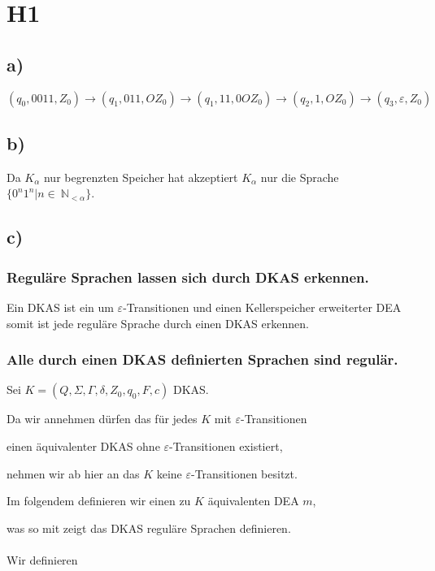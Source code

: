 \section*{H1}

\subsection*{a)}

$(q_{0},0011,Z_{0}) \to (q_{1},011,OZ_{0}) \to (q_{1},11,0OZ_{0}) \to (q_{2},1,OZ_{0}) \to (q_{3},\varepsilon,Z_{0})$

\subsection*{b)}

Da $K_{\alpha}$ nur begrenzten Speicher hat akzeptiert $K_{\alpha}$ nur die Sprache 
$\{0^{n}1^{n}|n\in~\mathbb{N}_{<\alpha}\}$.

\subsection*{c)}

\subsubsection*{Reguläre Sprachen lassen sich durch DKAS erkennen.}
Ein DKAS ist ein um $\varepsilon$-Transitionen und einen Kellerspeicher erweiterter DEA
somit ist jede reguläre Sprache durch einen DKAS erkennen.

\subsubsection*{Alle durch einen DKAS definierten Sprachen sind regulär.} 

Sei $K = (Q,\Sigma,\Gamma,\delta,Z_{0},q_{0},F,c)$ DKAS.

Da wir annehmen dürfen das für jedes $K$ mit $\varepsilon$-Transitionen

einen äquivalenter DKAS ohne $\varepsilon$-Transitionen existiert,

nehmen wir ab hier an das $K$ keine $\varepsilon$-Transitionen besitzt.

Im folgendem definieren wir einen zu $K$ äquivalenten DEA $m$,

was so mit zeigt das DKAS reguläre Sprachen definieren.

\paragraph{} Wir definieren

